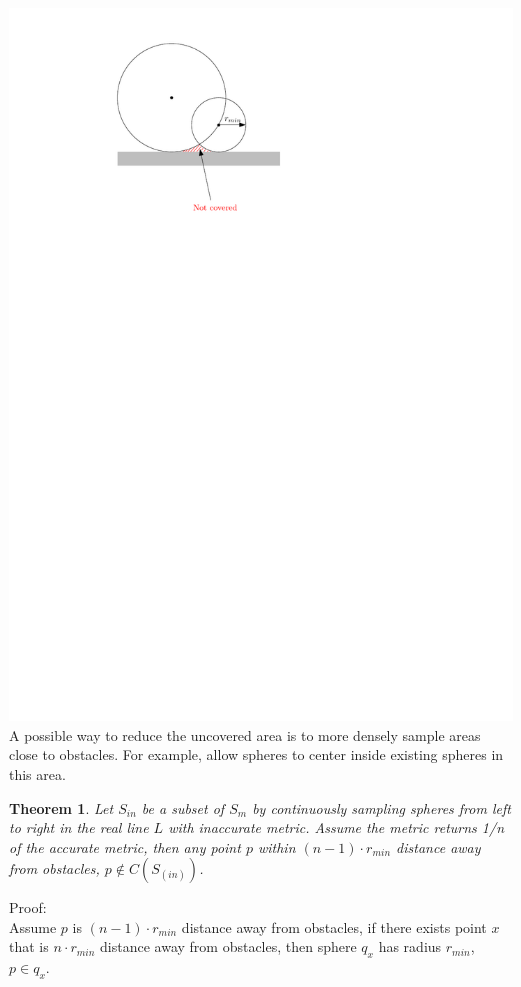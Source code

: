 \documentclass[12pt]{article}
\newtheorem{theorem}{Theorem}[section]
\begin{document}
  \includegraphics[scale=0.8]{sample2D_1_2}  \\
  
  A possible way to reduce the uncovered area is to more densely sample areas close to obstacles. For example, allow spheres to center inside existing spheres in this area.
  
  
  \begin{theorem}
  Let $S_{in}$ be a subset of $S_{m}$ by continuously sampling spheres from left to right in the real line $L$ with inaccurate metric. Assume the metric returns 1/n of the accurate metric, then any point $p$ within $(n-1) \cdot r_{min}$ distance away from obstacles, $p \notin C(S_(in))$.
  \end{theorem}
  
  Proof:\\
  
  Assume $p$ is $(n-1) \cdot r_{min}$ distance away from obstacles, if there exists point $x$ that is $n \cdot r_{min}$ distance away from obstacles, then sphere $q_{x}$ has radius $r_{min}$, $p \in q_{x}$. 
  
\end{document}
